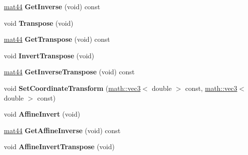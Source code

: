\begin{DoxyCompactItemize}
\item 
\hypertarget{classmath_1_1mat44_a0feaba4758ed52bac10f26fd799e2de3}{
\hyperlink{classmath_1_1mat44}{mat44} {\bfseries GetInverse} (void) const }
\label{classmath_1_1mat44_a0feaba4758ed52bac10f26fd799e2de3}

\item 
\hypertarget{classmath_1_1mat44_adc6ecd07ee39f9fe10513df7f30155dd}{
void {\bfseries Transpose} (void)}
\label{classmath_1_1mat44_adc6ecd07ee39f9fe10513df7f30155dd}

\item 
\hypertarget{classmath_1_1mat44_aa51cb99def454576932a5162256d517a}{
\hyperlink{classmath_1_1mat44}{mat44} {\bfseries GetTranspose} (void) const }
\label{classmath_1_1mat44_aa51cb99def454576932a5162256d517a}

\item 
\hypertarget{classmath_1_1mat44_a6460a465e3d8ae718f1e5abe95c9e25c}{
void {\bfseries InvertTranspose} (void)}
\label{classmath_1_1mat44_a6460a465e3d8ae718f1e5abe95c9e25c}

\item 
\hypertarget{classmath_1_1mat44_aa022f83245b05ffe83bf8e4ee5138f00}{
\hyperlink{classmath_1_1mat44}{mat44} {\bfseries GetInverseTranspose} (void) const }
\label{classmath_1_1mat44_aa022f83245b05ffe83bf8e4ee5138f00}

\item 
\hypertarget{classmath_1_1mat44_a3fb20ac063bbc5921bcaeb3ac92ab35b}{
void {\bfseries SetCoordinateTransform} (\hyperlink{classmath_1_1vec3}{math::vec3}$<$ double $>$ const, \hyperlink{classmath_1_1vec3}{math::vec3}$<$ double $>$ const)}
\label{classmath_1_1mat44_a3fb20ac063bbc5921bcaeb3ac92ab35b}

\item 
\hypertarget{classmath_1_1mat44_a7c09a54e77d1277e1f341d0a0ab88011}{
void {\bfseries AffineInvert} (void)}
\label{classmath_1_1mat44_a7c09a54e77d1277e1f341d0a0ab88011}

\item 
\hypertarget{classmath_1_1mat44_a5bb524e4b19475c5a36bad44689b557a}{
\hyperlink{classmath_1_1mat44}{mat44} {\bfseries GetAffineInverse} (void) const }
\label{classmath_1_1mat44_a5bb524e4b19475c5a36bad44689b557a}

\item 
\hypertarget{classmath_1_1mat44_aee84b07ad0b747d0aef09a975713f3a3}{
void {\bfseries AffineInvertTranspose} (void)}
\label{classmath_1_1mat44_aee84b07ad0b747d0aef09a975713f3a3}


\end{DoxyCompactItemize}
